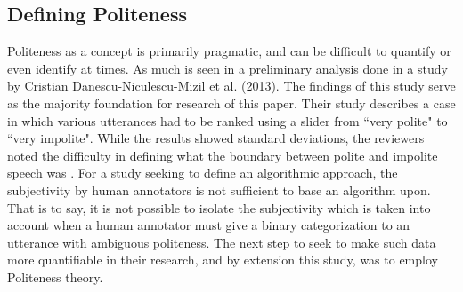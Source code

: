 \documentclass{article}
\begin{document}
\subsection{Defining Politeness}
Politeness as a concept is primarily pragmatic, and can be difficult to quantify or even identify at times. As much is seen in a preliminary analysis done in a study by Cristian Danescu-Niculescu-Mizil et al. (2013). The findings of this study serve as the majority foundation for research of this paper. Their study describes a case in which various utterances had to be ranked using a slider from ``very polite" to ``very impolite". While the results showed standard deviations, the reviewers noted the difficulty in defining what the boundary between polite and impolite speech was \cite{CAP}. For a study seeking to define an algorithmic approach, the subjectivity by human annotators is not sufficient to base an algorithm upon. That is to say, it is not possible to isolate the subjectivity which is taken into account when a human annotator must give a binary categorization to an utterance with ambiguous politeness. The next step to seek to make such data more quantifiable in their research, and by extension this study, was to employ Politeness theory.
\end{document}

